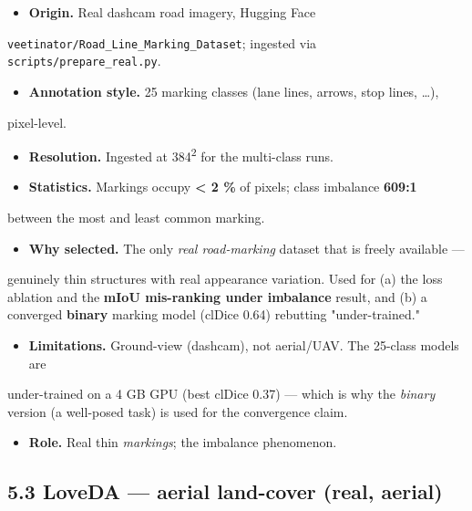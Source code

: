 \documentclass[11pt]{article}
\begin{document}
\begin{itemize}\setlength{\itemsep}{1pt}
\item \textbf{Origin.} Real dashcam road imagery, Hugging Face
\end{itemize}
  \texttt{veetinator/Road\_Line\_Marking\_Dataset}; ingested via \texttt{scripts/prepare\_real.py}.
\begin{itemize}\setlength{\itemsep}{1pt}
\item \textbf{Annotation style.} 25 marking classes (lane lines, arrows, stop lines, \ldots{}),
\end{itemize}
  pixel-level.
\begin{itemize}\setlength{\itemsep}{1pt}
\item \textbf{Resolution.} Ingested at 384\textsuperscript{2} for the multi-class runs.
\item \textbf{Statistics.} Markings occupy \textbf{< 2 \%} of pixels; class imbalance \textbf{609:1}
\end{itemize}
  between the most and least common marking.
\begin{itemize}\setlength{\itemsep}{1pt}
\item \textbf{Why selected.} The only \textit{real road-marking} dataset that is freely available ---
\end{itemize}
  genuinely thin structures with real appearance variation. Used for (a) the loss   ablation and the \textbf{mIoU mis-ranking under imbalance} result, and (b) a converged   \textbf{binary} marking model (clDice 0.64) rebutting "under-trained."
\begin{itemize}\setlength{\itemsep}{1pt}
\item \textbf{Limitations.} Ground-view (dashcam), not aerial/UAV. The 25-class models are
\end{itemize}
  under-trained on a 4 GB GPU (best clDice 0.37) --- which is why the \textit{binary} version   (a well-posed task) is used for the convergence claim.
\begin{itemize}\setlength{\itemsep}{1pt}
\item \textbf{Role.} Real thin \textit{markings}; the imbalance phenomenon.
\end{itemize}

\subsection*{5.3 LoveDA --- aerial land-cover (real, aerial)}
\end{document}
